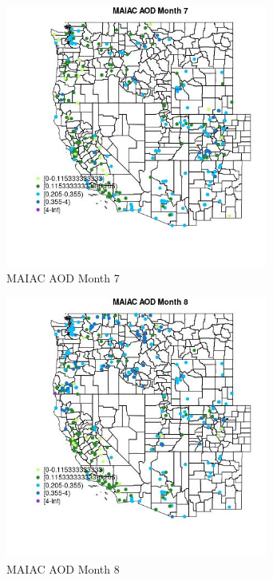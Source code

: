 \begin{figure} 
\centering  
\includegraphics[width=0.77\textwidth]{Code_Outputs/Report_ML_input_PM25_Step4_part_e_de_duplicated_aveswNAs_MapObsMo7MAIAC_AOD.jpg} 
\caption{\label{fig:Report_ML_input_PM25_Step4_part_e_de_duplicated_aveswNAsMapObsMo7MAIAC_AOD}MAIAC AOD Month 7} 
\end{figure} 
 

\clearpage 

\begin{figure} 
\centering  
\includegraphics[width=0.77\textwidth]{Code_Outputs/Report_ML_input_PM25_Step4_part_e_de_duplicated_aveswNAs_MapObsMo8MAIAC_AOD.jpg} 
\caption{\label{fig:Report_ML_input_PM25_Step4_part_e_de_duplicated_aveswNAsMapObsMo8MAIAC_AOD}MAIAC AOD Month 8} 
\end{figure} 
 

